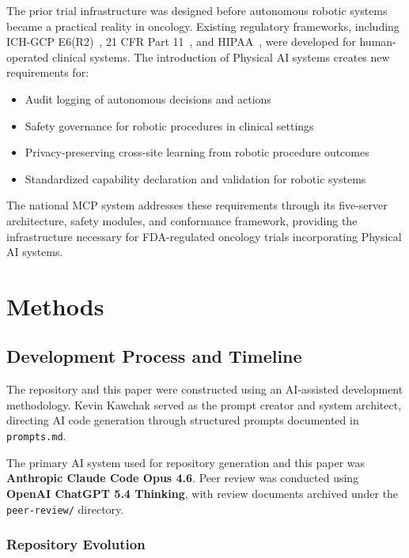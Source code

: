 \documentclass{article}
\begin{document}
The prior trial infrastructure was designed before autonomous robotic systems became a practical reality in oncology. Existing regulatory frameworks, including ICH-GCP E6(R2)~\cite{ichgcp2016}, 21 CFR Part 11~\cite{fda2003part11}, and HIPAA~\cite{hipaa1996}, were developed for human-operated clinical systems. The introduction of Physical AI systems creates new requirements for:

\begin{itemize}[leftmargin=*]
\item Audit logging of autonomous decisions and actions
\item Safety governance for robotic procedures in clinical settings
\item Privacy-preserving cross-site learning from robotic procedure outcomes
\item Standardized capability declaration and validation for robotic systems
\end{itemize}

The national MCP system addresses these requirements through its five-server architecture, safety modules, and conformance framework, providing the infrastructure necessary for FDA-regulated oncology trials incorporating Physical AI systems.

\section{Methods}
\label{sec:methods}

\subsection{Development Process and Timeline}

The repository and this paper were constructed using an AI-assisted development methodology. Kevin Kawchak served as the prompt creator and system architect, directing AI code generation through structured prompts documented in \texttt{prompts.md}.

The primary AI system used for repository generation and this paper was \textbf{Anthropic Claude Code Opus 4.6}. Peer review was conducted using \textbf{OpenAI ChatGPT 5.4 Thinking}, with review documents archived under the \texttt{peer-review/} directory.

\subsubsection{Repository Evolution}
\end{document}

